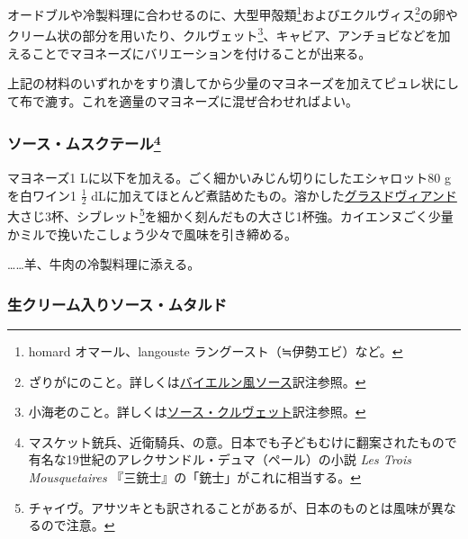 \begin{recette}
オードブルや冷製料理に合わせるのに、大型甲殻類\footnote{homard
  オマール、langouste ラングースト（≒伊勢エビ）など。}およびエクルヴィス\footnote{ざりがにのこと。詳しくは\protect\hyperlink{sauce-bavaroise}{バイエルン風ソース}訳注参照。}の卵やクリーム状の部分を用いたり、クルヴェット\footnote{小海老のこと。詳しくは\protect\hyperlink{sauce-aux-crevettes}{ソース・クルヴェット}訳注参照。}、キャビア、アンチョビなどを加えることでマヨネーズにバリエーションを付けることが出来る。

上記の材料のいずれかをすり潰してから少量のマヨネーズを加えてピュレ状にして布で漉す。これを適量のマヨネーズに混ぜ合わせればよい。

\hypertarget{sauce-mousquetaire}{%
\subsubsection[ソース・ムスクテール]{\texorpdfstring{ソース・ムスクテール\footnote{マスケット銃兵、近衛騎兵、の意。日本でも子どもむけに翻案されたもので有名な19世紀のアレクサンドル・デュマ（ペール）の小説
  \emph{Les Trois Mousquetaires} 『三銃士』の「銃士」がこれに相当する。}}{ソース・ムスクテール}}\label{sauce-mousquetaire}}



マヨネーズ1 Lに以下を加える。ごく細かいみじん切りにしたエシャロット80 g
を白ワイン1 \(\frac{1}{2}\)
dLに加えてほとんど煮詰めたもの。溶かした\protect\hyperlink{glace-de-viande}{グラスドヴィアンド}大さじ3杯、シブレット\footnote{チャイヴ。アサツキとも訳されることがあるが、日本のものとは風味が異なるので注意。}を細かく刻んだもの大さじ1杯強。カイエンヌごく少量かミルで挽いたこしょう少々で風味を引き締める。

\ldots{}\ldots{}羊、牛肉の冷製料理に添える。

\hypertarget{sauce-moutarde-a-la-creme}{%
\subsubsection{生クリーム入りソース・ムタルド}\label{sauce-moutarde-a-la-creme}}



\end{recette}
